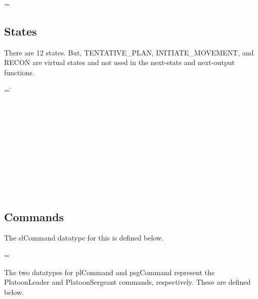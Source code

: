 \documentclass[../../main/main.tex]{subfiles}
\begin{document}
 =  \HOLTokenBar{} 

\subsection{States}
There are 12 states.  But, TENTATIVE_PLAN, INITIATE_MOVEMENT, and RECON are virtual states and not used in the next-state and next-output functions.

\begin{tabbing}
\parskip=8pt
 = \= \\
				\>\HOLTokenBar{}  \\
				\>\HOLTokenBar{}  \\
				\>\HOLTokenBar{} \\
        				\>\HOLTokenBar{}  \\
				\>\HOLTokenBar{}  \\
				\>\HOLTokenBar{}  \\
				\>\HOLTokenBar{} \\
        				\>\HOLTokenBar{}  \\
				\>\HOLTokenBar{}  \\
				\>\HOLTokenBar{}  \\
				\>\HOLTokenBar{} 
\parskip=18pt
\end{tabbing}

\subsection{Commands}
The slCommand datatype for this  is defined below.

 =   \HOLTokenBar{}  

The two datatypes for plCommand and psgCommand represent the PlatoonLeader and PlatoonSergeant commands, respectively. These are defined below.
\end{document}
